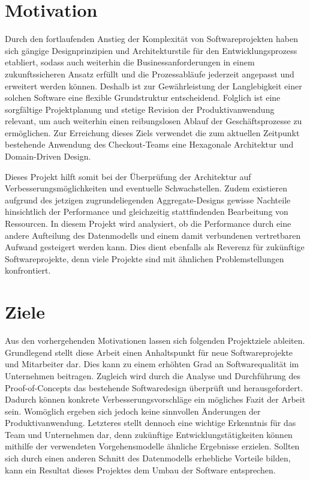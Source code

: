 \section{Motivation}

Durch den fortlaufenden Anstieg der Komplexität von Softwareprojekten \cite{Darcy.2010}  haben sich gängige Designprinzipien und Architekturstile für den Entwicklungsprozess etabliert, sodass auch weiterhin die Businessanforderungen in einem zukunftssicheren Ansatz erfüllt und die Prozessabläufe jederzeit angepasst und erweitert werden können. Deshalb ist zur Gewährleistung der Langlebigkeit einer solchen Software eine flexible Grundstruktur entscheidend. Folglich ist eine sorgfältige Projektplanung und stetige Revision der Produktivanwendung relevant, um auch weiterhin einen reibungslosen Ablauf der Geschäftsprozesse zu ermöglichen. Zur Erreichung dieses Ziels verwendet die zum aktuellen Zeitpunkt bestehende Anwendung des Checkout-Teams eine Hexagonale Architektur und Domain-Driven Design.

Dieses Projekt hilft somit bei der Überprüfung der Architektur auf Verbesserungsmöglichkeiten und eventuelle Schwachstellen. Zudem existieren aufgrund des jetzigen zugrundeliegenden Aggregate-Designs gewisse Nachteile hinsichtlich der Performance und gleichzeitig stattfindenden Bearbeitung von Ressourcen. In diesem Projekt wird analysiert, ob die Performance durch eine andere Aufteilung des Datenmodells und einem damit verbundenen vertretbaren Aufwand gesteigert werden kann. Dies dient ebenfalls als Reverenz für zukünftige Softwareprojekte, denn viele Projekte sind mit ähnlichen Problemstellungen konfrontiert.



\section{Ziele}

Aus den vorhergehenden Motivationen lassen sich folgenden Projektziele ableiten. Grundlegend stellt diese Arbeit einen Anhaltspunkt für neue Softwareprojekte und Mitarbeiter dar. Dies kann zu einem erhöhten Grad an Softwarequalität im Unternehmen beitragen. Zugleich wird durch die Analyse und Durchführung des Proof-of-Concepts das bestehende Softwaredesign überprüft und herausgefordert. Dadurch können konkrete Verbesserungsvorschläge ein mögliches Fazit der Arbeit sein. Womöglich ergeben sich jedoch keine sinnvollen Änderungen der Produktivanwendung. Letzteres stellt dennoch eine wichtige Erkenntnis für das Team und Unternehmen dar, denn zukünftige Entwicklungstätigkeiten können mithilfe der verwendeten Vorgehensmodelle ähnliche Ergebnisse erzielen. Sollten sich durch einen anderen Schnitt des Datenmodells erhebliche Vorteile bilden, kann ein Resultat dieses Projektes dem Umbau der Software entsprechen.
